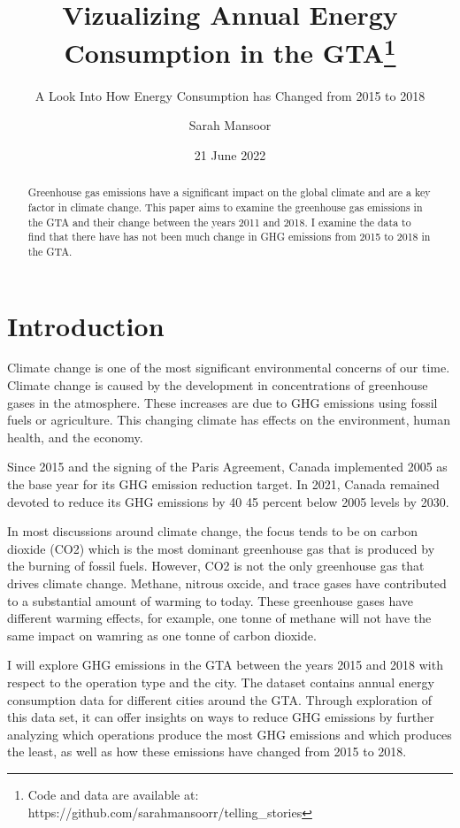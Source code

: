 \documentclass[
  letterpaper,
  DIV=11,
  numbers=noendperiod]{scrartcl}
\title{Vizualizing Annual Energy Consumption in the GTA\thanks{Code and
data are available at:
https://github.com/sarahmansoorr/telling\_stories}}
\subtitle{A Look Into How Energy Consumption has Changed from 2015 to
2018}
\author{Sarah Mansoor}
\date{21 June 2022}
\begin{document}
\maketitle
\begin{abstract}
Greenhouse gas emissions have a significant impact on the global climate
and are a key factor in climate change. This paper aims to examine the
greenhouse gas emissions in the GTA and their change between the years
2011 and 2018. I examine the data to find that there have has not been
much change in GHG emissions from 2015 to 2018 in the GTA.
\end{abstract}
\ifdefined\Shaded\renewenvironment{Shaded}{\begin{tcolorbox}[breakable, borderline west={3pt}{0pt}{shadecolor}, frame hidden, interior hidden, boxrule=0pt, sharp corners, enhanced]}{\end{tcolorbox}}\fi

\hypertarget{introduction}{%
\section{Introduction}\label{introduction}}

Climate change is one of the most significant environmental concerns of
our time. Climate change is caused by the development in concentrations
of greenhouse gases in the atmosphere. These increases are due to GHG
emissions using fossil fuels or agriculture. This changing climate has
effects on the environment, human health, and the economy.

Since 2015 and the signing of the Paris Agreement, Canada implemented
2005 as the base year for its GHG emission reduction target. In 2021,
Canada remained devoted to reduce its GHG emissions by 40 45 percent
below 2005 levels by 2030.

In most discussions around climate change, the focus tends to be on
carbon dioxide (CO2) which is the most dominant greenhouse gas that is
produced by the burning of fossil fuels. However, CO2 is not the only
greenhouse gas that drives climate change. Methane, nitrous oxcide, and
trace gases have contributed to a substantial amount of warming to
today. These greenhouse gases have different warming effects, for
example, one tonne of methane will not have the same impact on wamring
as one tonne of carbon dioxide.

I will explore GHG emissions in the GTA between the years 2015 and 2018
with respect to the operation type and the city. The dataset contains
annual energy consumption data for different cities around the GTA.
Through exploration of this data set, it can offer insights on ways to
reduce GHG emissions by further analyzing which operations produce the
most GHG emissions and which produces the least, as well as how these
emissions have changed from 2015 to 2018.
\end{document}
